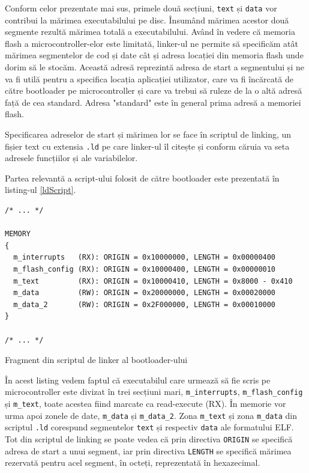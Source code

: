 \documentclass[12pt,a4paper,titlepage]{report}
\begin{document}
Conform celor prezentate mai sus, primele două secțiuni, \texttt{text} și \texttt{data} vor contribui la mărimea executabilului pe disc. Însumând mărimea acestor două segmente rezultă mărimea totală a executabilului. Având în vedere că memoria flash a microcontroller-elor este limitată, linker-ul ne permite să specificăm atât mărimea segmentelor de cod și date cât și adresa locației din memoria flash unde dorim să le stocăm. Această adresă reprezintă adresa de start a segmentului și ne va fi utilă pentru a specifica locația aplicației utilizator, care va fi încărcată de către bootloader pe microcontroller și care va trebui să ruleze de la o altă adresă față de cea standard. Adresa "standard" este în general prima adresă a memoriei flash. 

Specificarea adreselor de start și mărimea lor se face în scriptul de linking, un fișier text cu extensia \texttt{.ld} pe care linker-ul îl citește și conform căruia va seta adresele funcțiilor și ale variabilelor.

Partea relevantă a script-ului folosit de către bootloader este prezentată în listing-ul \ref{ldScript}.

\begin{listing}[h]
\begin{verbatim}
/* ... */

MEMORY
{
  m_interrupts   (RX): ORIGIN = 0x10000000, LENGTH = 0x00000400
  m_flash_config (RX): ORIGIN = 0x10000400, LENGTH = 0x00000010
  m_text         (RX): ORIGIN = 0x10000410, LENGTH = 0x8000 - 0x410
  m_data         (RW): ORIGIN = 0x20000000, LENGTH = 0x00020000
  m_data_2       (RW): ORIGIN = 0x2F000000, LENGTH = 0x00010000
}

/* ... */
\end{verbatim}

\caption{Fragment din scriptul de linker al bootloader-ului}
\label{ldScript}
\end{listing}

În acest listing vedem faptul că  executabilul care urmează să fie scris pe microcontroller este divizat în trei secțiuni mari, \texttt{m\_interrupts}, \texttt{m\_flash\_config} și \texttt{m\_text}, toate acestea fiind marcate ca read-execute (RX). În memorie vor urma apoi zonele de date, \texttt{m\_data} și \texttt{m\_data\_2}. Zona \texttt{m\_text} și zona \texttt{m\_data} din scriptul \texttt{.ld} corespund segmentelor \texttt{text} și respectiv \texttt{data} ale formatului ELF. Tot din scriptul de linking se poate vedea că prin directiva \texttt{ORIGIN} se specifică adresa de start a unui segment, iar prin directiva \texttt{LENGTH} se specifică mărimea rezervată pentru acel segment, în octeți, reprezentată în hexazecimal.
\end{document}

